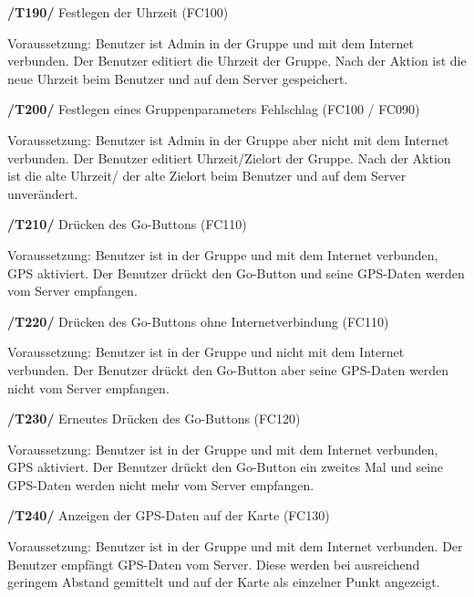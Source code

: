 \begin{itemize}
\begin{itemize}
\begin{itemize}
\begin{itemize}
\textbf{/T190/} Festlegen der Uhrzeit (FC100)\\
\begin{itemize}
Voraussetzung: Benutzer ist Admin in der Gruppe und mit dem Internet verbunden.
Der Benutzer editiert die Uhrzeit der Gruppe.
Nach der Aktion ist die neue Uhrzeit beim Benutzer und auf dem Server gespeichert.
\end{itemize}

\textbf{/T200/} Festlegen eines Gruppenparameters Fehlschlag (FC100 / FC090)\\
\begin{itemize}
Voraussetzung: Benutzer ist Admin in der Gruppe aber nicht mit dem Internet verbunden.
Der Benutzer editiert Uhrzeit/Zielort der Gruppe.
Nach der Aktion ist die alte Uhrzeit/ der alte Zielort beim Benutzer und auf dem Server unverändert.
\end{itemize}

\textbf{/T210/} Drücken des Go-Buttons (FC110)\\
\begin{itemize}
Voraussetzung: Benutzer ist in der Gruppe und mit dem Internet verbunden, GPS aktiviert.
Der Benutzer drückt den Go-Button und seine GPS-Daten werden vom Server empfangen.
\end{itemize}

\textbf{/T220/} Drücken des Go-Buttons ohne Internetverbindung (FC110)\\
\begin{itemize}
Voraussetzung: Benutzer ist in der Gruppe und nicht mit dem Internet verbunden.
Der Benutzer drückt den Go-Button aber seine GPS-Daten werden nicht vom Server empfangen.
\end{itemize}

\textbf{/T230/} Erneutes Drücken des Go-Buttons (FC120)\\
\begin{itemize}
Voraussetzung: Benutzer ist in der Gruppe und mit dem Internet verbunden, GPS aktiviert.
Der Benutzer drückt den Go-Button ein zweites Mal und seine GPS-Daten werden nicht mehr vom Server empfangen.
\end{itemize}

\textbf{/T240/} Anzeigen der GPS-Daten auf der Karte (FC130)\\
\begin{itemize}
Voraussetzung: Benutzer ist in der Gruppe und mit dem Internet verbunden.
Der Benutzer empfängt GPS-Daten vom Server. Diese werden bei ausreichend geringem Abstand gemittelt
und auf der Karte als einzelner Punkt angezeigt.
\end{itemize}


\end{itemize}
\end{itemize}
\end{itemize}
\end{itemize}
